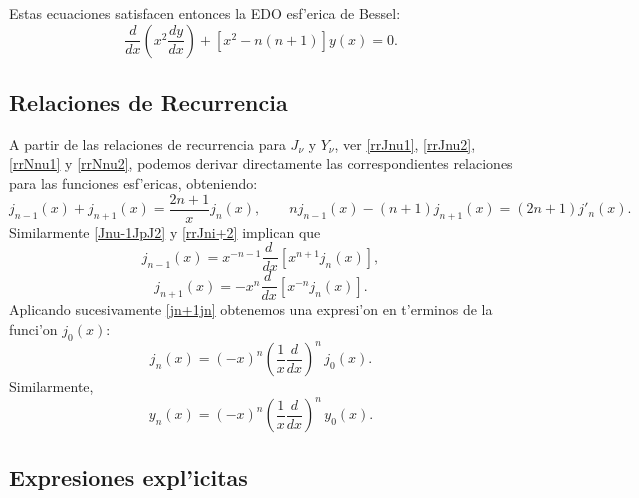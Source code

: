 Estas ecuaciones satisfacen entonces la EDO esf'erica de Bessel:
\begin{equation}
\frac{d}{dx}\left(x^2\frac{dy}{dx}\right)+[x^2-n(n+1)]y(x)=0.
\end{equation}
\subsection{Relaciones de Recurrencia}
A partir de las relaciones de recurrencia para $J_\nu$ y $Y_\nu$, ver \eqref{rrJnu1}, \eqref{rrJnu2}, \eqref{rrNnu1} y \eqref{rrNnu2}, podemos derivar directamente las correspondientes relaciones para las funciones esf'ericas, obteniendo:
\begin{equation}
j_{n-1}(x)+j_{n+1}(x)=\frac{2n+1}{x}j_n(x), \qquad nj_{n-1}(x)-(n+1)j_{n+1}(x)=(2n+1)j'_n(x).
\end{equation}
Similarmente \eqref{Jnu-1JpJ2} y \eqref{rrJni+2} implican que
\begin{equation}
j_{n-1}(x)=x^{-n-1}\frac{d\ }{dx}\left[x^{n+1}j_n(x)\right],
\end{equation}
\begin{equation}\label{jn+1jn}
j_{n+1}(x)=-x^{n}\frac{d\ }{dx}\left[x^{-n}j_n(x)\right].
\end{equation}
Aplicando sucesivamente \eqref{jn+1jn} obtenemos una expresi'on en t'erminos de la funci'on $j_0(x)$:
\begin{equation}
j_n(x) = (-x)^n \left(\frac{1}{x}\frac{d}{dx}\right)^n\,j_0(x) .
\end{equation}
Similarmente,
\begin{equation}
y_n(x) = (-x)^n \left(\frac{1}{x}\frac{d}{dx}\right)^n\,y_0(x).
\end{equation}

\subsection{Expresiones expl'icitas}

